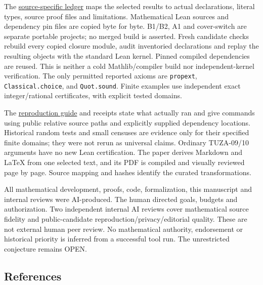 \documentclass[11pt]{article}
\begin{document}
The \href{https://github.com/pappa211/ai-math-experiments/blob/main/STATUS_AND_PROVENANCE.md}{source-specific ledger} maps the selected results to actual declarations, literal types, source proof files and limitations. Mathematical Lean sources and dependency pin files are copied byte for byte. B1/B2, A1 and cover-switch are separate portable projects; no merged build is asserted. Fresh candidate checks rebuild every copied closure module, audit inventoried declarations and replay the resulting objects with the standard Lean kernel. Pinned compiled dependencies are reused. This is neither a cold Mathlib/compiler build nor independent-kernel verification. The only permitted reported axioms are \texttt{propext}, \texttt{Classical.choice}, and \texttt{Quot.sound}. Finite examples use independent exact integer/rational certificates, with explicit tested domains.

The \href{https://github.com/pappa211/ai-math-experiments/blob/main/REPRODUCTION.md}{reproduction guide} and receipts state what actually ran and give commands using public relative source paths and explicitly supplied dependency locations. Historical random tests and small censuses are evidence only for their specified finite domains; they were not rerun as universal claims. Ordinary TUZA-09/10 arguments have no new Lean certification. The paper derives Markdown and LaTeX from one selected text, and its PDF is compiled and visually reviewed page by page. Source mapping and hashes identify the curated transformations.

All mathematical development, proofs, code, formalization, this manuscript and internal reviews were AI-produced. The human directed goals, budgets and authorization. Two independent internal AI reviews cover mathematical source fidelity and public-candidate reproduction/privacy/editorial quality. These are not external human peer review. No mathematical authority, endorsement or historical priority is inferred from a successful tool run. The unrestricted conjecture remains OPEN.

\subsection*{References}\label{references}
\end{document}
